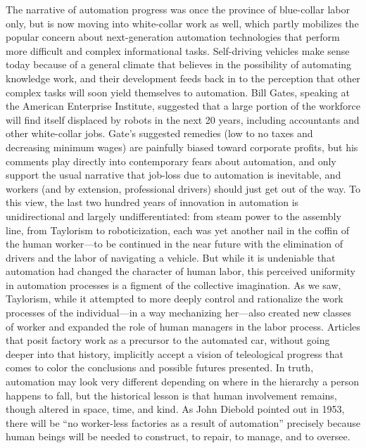 The narrative of automation progress was once the province of
blue-collar labor only, but is now moving into white-collar work as
well, which partly mobilizes the popular concern about next-generation
automation technologies that perform more difficult and complex
informational tasks. Self-driving vehicles make sense today because of
a general climate that believes in the possibility of automating
knowledge work, and their development feeds back in to the perception
that other complex tasks will soon yield themselves to automation. Bill
Gates, speaking at the American Enterprise Institute,
suggested that a large portion of the workforce will find itself
displaced by robots in the next 20 years, including accountants and
other white-collar
jobs.\cite{gatesRobots}
Gate's suggested remedies (low to no taxes and decreasing minimum
wages) are painfully biased toward corporate profits, but his comments play directly into
contemporary fears about automation, and only support the usual
narrative that job-loss due to automation is inevitable, and workers
(and by extension, professional drivers)
should just get out of the way. To this view, the last two hundred
years of innovation in automation is unidirectional and largely
undifferentiated:  from steam power to the assembly line, from
Taylorism to roboticization, each was yet another nail in the coffin
of the human worker---to be continued in the near future with the
elimination of drivers and the labor of navigating a vehicle. But
while it is undeniable that automation had changed the
character of human labor, this perceived uniformity in automation
processes is a figment of the collective imagination. As we saw,
Taylorism, while it attempted to more deeply control and rationalize
the work processes of the individual---in a way mechanizing her---also
created new classes of worker and expanded the role of human managers
in the labor process. Articles that posit factory work as a precursor to the automated
car, without going deeper into that history, implicitly accept a
vision of teleological progress that comes to color the conclusions
and possible futures presented. In truth, automation may look very
different depending on where in the hierarchy 
a person happens to fall, but the historical lesson is that human
involvement remains, though altered in space, time, and kind. As John
Diebold pointed out in 1953, there will be ``no worker-less
factories as a result of automation''\cite[p. 63-64]{dieboldNew}
precisely because human beings will be needed to construct, to repair,
to manage, and to oversee.

